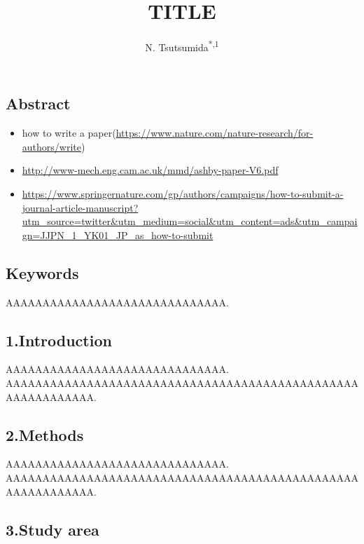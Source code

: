 \documentclass[
  xelatex,ja=standard]{article}
\title{TITLE}
\author{N. Tsutsumida\textsuperscript{*,1}}
\date{}
\providecommand{\tightlist}{%
  \setlength{\itemsep}{0pt}\setlength{\parskip}{0pt}}
\begin{document}
\maketitle

\hypertarget{abstract}{%
\subsection{Abstract}\label{abstract}}

\begin{itemize}
\tightlist
\item
  how to write a
  paper(\url{https://www.nature.com/nature-research/for-authors/write})
\item
  \url{http://www-mech.eng.cam.ac.uk/mmd/ashby-paper-V6.pdf}
\item
  \url{https://www.springernature.com/gp/authors/campaigns/how-to-submit-a-journal-article-manuscript?utm_source=twitter\&utm_medium=social\&utm_content=ads\&utm_campaign=JJPN_1_YK01_JP_as_how-to-submit}
\end{itemize}

\hypertarget{keywords}{%
\subsection{Keywords}\label{keywords}}

AAAAAAAAAAAAAAAAAAAAAAAAAAAAAA.

\hypertarget{introduction}{%
\subsection{1.Introduction}\label{introduction}}

AAAAAAAAAAAAAAAAAAAAAAAAAAAAAA.\\
AAAAAAAAAAAAAAAAAAAAAAAAAAAAAAAAAAAAAAAAAAAAAAAAAAAAAAAAAAAA.

\hypertarget{methods}{%
\subsection{2.Methods}\label{methods}}

AAAAAAAAAAAAAAAAAAAAAAAAAAAAAA.\\
AAAAAAAAAAAAAAAAAAAAAAAAAAAAAAAAAAAAAAAAAAAAAAAAAAAAAAAAAAAA.

\hypertarget{study-area}{%
\subsection{3.Study area}\label{study-area}}
\end{document}

